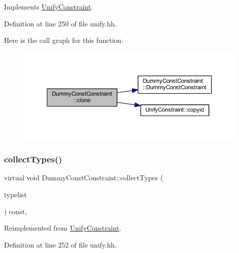 Implements \mbox{\hyperlink{class_unify_constraint_a4f068343932637d355644bb21559aa12}{Unify\+Constraint}}.



Definition at line 250 of file unify.\+hh.

Here is the call graph for this function\+:
\nopagebreak
\begin{figure}[H]
\begin{center}
\leavevmode
\includegraphics[width=350pt]{class_dummy_const_constraint_acf3f66f2d189379f19ee11c14278ab3d_cgraph}
\end{center}
\end{figure}
\mbox{\label{class_dummy_const_constraint_a2ff9cf3267d687c2f741f3d483b3da58}} 
\subsubsection{\texorpdfstring{collectTypes()}{collectTypes()}}
{\footnotesize\ttfamily virtual void Dummy\+Const\+Constraint\+::collect\+Types (\begin{DoxyParamCaption}\item[{vector$<$ \mbox{\hyperlink{class_unify_datatype}{Unify\+Datatype}} $>$ \&}]{typelist }\end{DoxyParamCaption}) const\hspace{0.3cm}{\ttfamily [inline]}, {\ttfamily [virtual]}}



Reimplemented from \mbox{\hyperlink{class_unify_constraint_acb83b6bea3b21e13054e72ac9cfaba0f}{Unify\+Constraint}}.



Definition at line 252 of file unify.\+hh.

\mbox{\label{class_dummy_const_constraint_acd0721d4535d7793e10b8ad60b3ab789}} 
